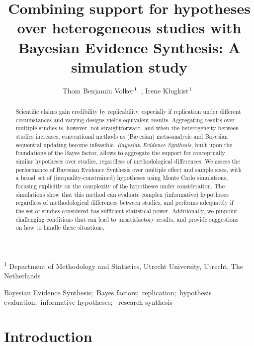\documentclass[
]{interact}
\title{Combining support for hypotheses over heterogeneous studies with
Bayesian Evidence Synthesis: A simulation study}
\author{Thom Benjamin
Volker$\textsuperscript{1}$~\orcidlink{0000-0002-2408-7820}, Irene
Klugkist$\textsuperscript{1}$~\orcidlink{0000-0001-9561-3691}}
\begin{document}
\maketitle
\textsuperscript{1} Department of Methodology and Statistics, Utrecht
University, Utrecht, The Netherlands
\begin{abstract}
Scientific claims gain credibility by replicability, especially if
replication under different circumstances and varying designs yields
equivalent results. Aggregating results over multiple studies is,
however, not straightforward, and when the heterogeneity between studies
increases, conventional methods as (Bayesian) meta-analysis and Bayesian
sequential updating become infeasible. \emph{Bayesian Evidence
Synthesis}, built upon the foundations of the Bayes factor, allows to
aggregate the support for conceptually similar hypotheses over studies,
regardless of methodological differences. We assess the performance of
Bayesian Evidence Synthesis over multiple effect and sample sizes, with
a broad set of (inequality-constrained) hypotheses using Monte Carlo
simulations, focusing explicitly on the complexity of the hypotheses
under consideration. The simulations show that this method can evaluate
complex (informative) hypotheses regardless of methodological
differences between studies, and performs adequately if the set of
studies considered has sufficient statistical power. Additionally, we
pinpoint challenging conditions that can lead to unsatisfactory results,
and provide suggestions on how to handle these situations.
\end{abstract}
\begin{keywords}
\def\sep{;\ }
Bayesian Evidence Synthesis\sep Bayes
factors\sep replication\sep hypothesis evaluation\sep informative
hypotheses\sep 
research synthesis
\end{keywords}
\ifdefined\Shaded\renewenvironment{Shaded}{\begin{tcolorbox}[breakable, frame hidden, interior hidden, borderline west={3pt}{0pt}{shadecolor}, boxrule=0pt, sharp corners, enhanced]}{\end{tcolorbox}}\fi

\doublespacing
{}

\hypertarget{introduction}{%
\section{Introduction}\label{introduction}}
\end{document}
